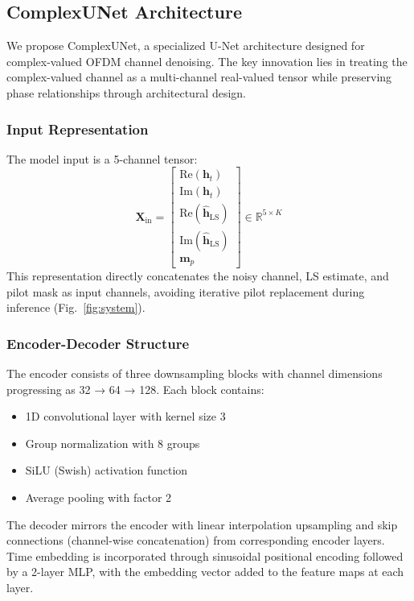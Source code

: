 \documentclass[conference]{IEEEtran}
\begin{document}
\subsection{ComplexUNet Architecture}

We propose ComplexUNet, a specialized U-Net \cite{ronneberger2015unet} architecture designed for complex-valued OFDM channel denoising. The key innovation lies in treating the complex-valued channel as a multi-channel real-valued tensor while preserving phase relationships through architectural design.

\subsubsection{Input Representation}

The model input is a 5-channel tensor:
\begin{equation}
\mathbf{X}_{\text{in}} = \begin{bmatrix}
\text{Re}(\mathbf{h}_t) \\
\text{Im}(\mathbf{h}_t) \\
\text{Re}(\hat{\mathbf{h}}_{\text{LS}}) \\
\text{Im}(\hat{\mathbf{h}}_{\text{LS}}) \\
\mathbf{m}_p
\end{bmatrix} \in \mathbb{R}^{5 \times K}
\end{equation}
This representation directly concatenates the noisy channel, LS estimate, and pilot mask as input channels, avoiding iterative pilot replacement during inference (Fig.~\ref{fig:system}).

\subsubsection{Encoder-Decoder Structure}

The encoder consists of three downsampling blocks with channel dimensions progressing as 32 → 64 → 128. Each block contains:
\begin{itemize}
\item 1D convolutional layer with kernel size 3
\item Group normalization with 8 groups
\item SiLU (Swish) activation function
\item Average pooling with factor 2
\end{itemize}

The decoder mirrors the encoder with linear interpolation upsampling and skip connections (channel-wise concatenation) from corresponding encoder layers. Time embedding is incorporated through sinusoidal positional encoding followed by a 2-layer MLP, with the embedding vector added to the feature maps at each layer.
\end{document}
